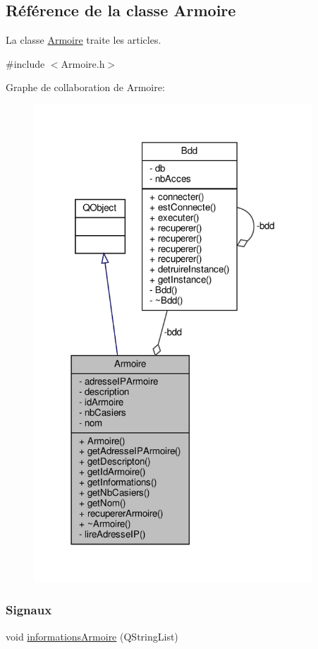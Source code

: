 \hypertarget{class_armoire}{}\subsection{Référence de la classe Armoire}
\label{class_armoire}


La classe \hyperlink{class_armoire}{Armoire} traite les articles.  




{\ttfamily \#include $<$Armoire.\+h$>$}



Graphe de collaboration de Armoire\+:
\nopagebreak
\begin{figure}[H]
\begin{center}
\leavevmode
\includegraphics[width=296pt]{class_armoire__coll__graph}
\end{center}
\end{figure}
\subsubsection*{Signaux}
\begin{DoxyCompactItemize}
\item 
void \hyperlink{class_armoire_a1fc00ceaa842f579ee31c532a9b01508}{informations\+Armoire} (Q\+String\+List)
\end{DoxyCompactItemize}

